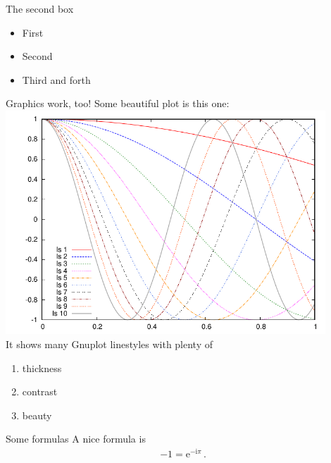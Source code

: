 \begin{greenbox}{The second box}
  \begin{itemize}
  \item First
  \item Second
  \item Third and forth
  \end{itemize}
\end{greenbox}

\begin{greenbox}{Graphics work, too!}
  Some beautiful plot is this one:\\ %
  \includegraphics[width=0.9\textwidth]{images/colortest}\\
  It shows many Gnuplot linestyles with plenty of
  \begin{enumerate}
  \item thickness
  \item contrast
  \item beauty
  \end{enumerate}

\end{greenbox}

\columnbreak

\begin{greenbox}{Some formulas}
  A nice formula is\\
  \begin{align*}
    -1 = \mathrm{e}^{-\mathrm{i}\pi}\, .
  \end{align*}
\end{greenbox}

